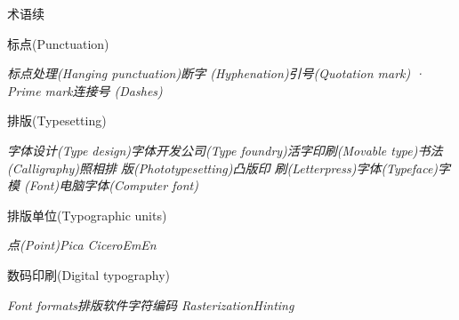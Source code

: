 ﻿\documentclass[hyperref={bookmarks=true},xcolor=pdflatex,svgnames,table,compress]{beamer}
\begin{document}
\begin{frame}{术语\textperiodcentered 续}

  {\normalsize 标点(Punctuation)}

  {\scriptsize \itshape 标点处理(Hanging punctuation)\textperiodcentered 断字
    (Hyphenation)\textperiodcentered 引号(Quotation mark) · Prime mark\textperiodcentered 连接号
    (Dashes)}

  {\normalsize 排版(Typesetting)}

  {\scriptsize \itshape 字体设计(Type design)\textperiodcentered 字体开发公司(Type
    foundry)\textperiodcentered 活字印刷(Movable
    type)\textperiodcentered 书法(Calligraphy)\textperiodcentered 照相排
    版(Phototypesetting)\textperiodcentered 凸版印
    刷(Letterpress)\textperiodcentered 字体(Typeface)\textperiodcentered 字模
    (Font)\textperiodcentered 电脑字体(Computer font)}

  {\normalsize 排版单位(Typographic units)}

  {\scriptsize \itshape 点(Point)\textperiodcentered Pica\textperiodcentered
    Cicero\textperiodcentered Em\textperiodcentered En}

  {\normalsize 数码印刷(Digital typography)}

  {\scriptsize \itshape Font formats\textperiodcentered 排版软件\textperiodcentered 字符编码
    \textperiodcentered Rasterization\textperiodcentered Hinting}

\end{frame}
\end{document}
